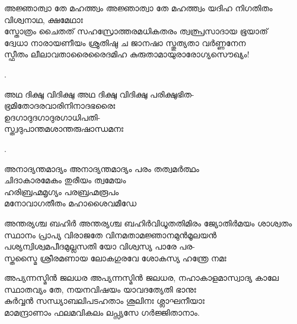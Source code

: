 \begin{enumerate}


\begin{slokam}{\VSr}{\Melp}{അജ്ഞാത്വാ തേ മഹത്ത്വം}
അജ്ഞാത്വാ തേ മഹത്ത്വം യദിഹ നിഗതിതം വിശ്വനാഥ, ക്ഷമേഥാഃ\\
സ്തോത്രം ചൈതത്‌ സഹസ്രോത്തരമധികതരം ത്വത്പ്രസാദായ ഭൂയാത്‌\\
ദ്വേധാ നാരായണീയം ശ്രുതിഷു ച ജാനഷാ സ്തുത്യതാ വര്‍ണ്ണനേന\\
സ്ഫീതം ലീലാവതാരൈരൈദമിഹ കുരുതാമായുരാരോഗ്യസൌഖ്യം!
\end{slokam}


.

\begin{slokam}{\VTd}{\Melp}{അഥ ദിക്ഷു വിദിക്ഷു}
അഥ ദിക്ഷു വിദിക്ഷു പരിക്ഷുഭിത-\\
ഭ്രമിതോദരവാരിനിനാദഭരൈഃ\\
ഉദഗാദുദഗാദുരഗാധിപതി-\\
സ്ത്വദുപാന്തമശാന്തരുഷാന്ധമനഃ
\end{slokam}


.


\begin{slokam}{\VBh}{\Sank}{അനാദ്യന്തമാദ്യം}
അനാദ്യന്തമാദ്യം പരം തത്വമർത്ഥം\\
ചിദാകാരമേകം തുരീയം ത്വമേയം\\
ഹരിബ്രഹ്മമൃഗ്യം പരബ്രഹ്മരൂപം\\
മനോവാഗതീതം മഹാശൈവമീഡേ
\end{slokam}


\begin{slokam}{\VSv}{\Unk}{അന്തര്യശ്ച ബഹിർ}
അന്തര്യശ്ച ബഹിർവിധൂതതിമിരം ജ്യോതിർമയം ശാശ്വതം\\
സ്ഥാനം പ്രാപ്യ വിരാജതേ വിനമതാമജ്ഞാനമുൻമൂലയൻ\\
പശ്യന്വിശ്വമപീദമുല്ലസതി യോ വിശ്വസ്യ പാരേ പര-\\
സ്തസ്മൈ ശ്രീരമണായ ലോകഗുരവേ ശോകസ്യ ഹന്ത്രേ നമഃ
\end{slokam}




\begin{slokam}{\VMk}{\KD}{അപ്യന്നസ്മിൻ ജലധര}
അപ്യന്നസ്മിൻ ജലധര, നഹാകാളമാസ്വാദ്യ കാലേ \\
സ്ഥാതവ്യം തേ, നയനവിഷയം യാവദത്യേതി ഭാനുഃ \\
കുർവ്വൻ സന്ധ്യാബലിപടഹതാം ശൂലിനഃ ശ്ലാഘനീയാഃ \\
മാമന്ദ്രാണാം ഫലമവികലം ലപ്സ്യസേ ഗർജ്ജിതാനാം. 
\end{slokam}


\end{enumerate}
